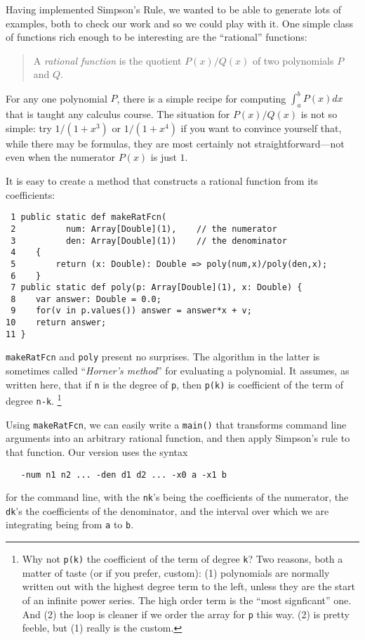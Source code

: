 Having implemented Simpson's Rule, we wanted to be able to generate lots of
examples, both to check our work and so we could play with it.  One simple
class of functions rich enough to be interesting are the ``rational'' functions:
\begin{quote}
A {\em rational function} is the quotient $P(x)/Q(x)$ of two polynomials $P$
and $Q$.
\end{quote} 
  For any one polynomial $P$, there is a simple recipe for computing
$\int_a^b P(x)dx$ that is taught any calculus course.  The situation
for $P(x)/Q(x)$ is not so simple: try $1/(1+x^3)$ or $1/(1+x^4)$ if you want to
convince yourself that, while there may be formulas, they are most certainly not
straightforward---not even when the numerator $P(x)$ is just $1$.

It is easy to create a method that constructs a rational function from its 
coefficients:
\begin{verbatim}
 1 public static def makeRatFcn(
 2          num: Array[Double](1),    // the numerator
 3          den: Array[Double](1))    // the denominator 
 4    {   
 5        return (x: Double): Double => poly(num,x)/poly(den,x);
 6    }
 7 public static def poly(p: Array[Double](1), x: Double) {
 8    var answer: Double = 0.0;
 9    for(v in p.values()) answer = answer*x + v;
10    return answer;
11 }
\end{verbatim}

{\tt makeRatFcn} and {\tt poly} present no surprises.  The algorithm in the
latter is sometimes called ``{\em Horner's method}'' for evaluating a polynomial.
It assumes, as written here, that if {\tt n} is the degree of {\tt p}, then
{\tt p(k)} is coefficient of the term of degree {\tt n-k}.
\footnote{
Why not {\tt p(k)} the coefficient of the term of degree {\tt k}?  Two reasons,
both a matter of taste (or if you prefer, custom):  (1) polynomials are normally
written out with the highest degree term to the left, unless they are the
start of an infinite power series.  The high order term is the ``most signficant''
one.  And (2) the loop is cleaner if we order the array for {\tt p} this way.
(2) is pretty feeble, but (1) really is the custom.
}

Using {\tt makeRatFcn}, we can easily write a {\tt main()} that transforms command
line arguments into an arbitrary rational function, and then apply Simpson's
rule to that function. Our version uses the syntax
\begin{verbatim}
   -num n1 n2 ... -den d1 d2 ... -x0 a -x1 b
\end{verbatim}
for the command line, with the {\tt nk}'s being the coefficients of the
numerator, the {\tt dk}'s the coefficients of the denominator, and the interval
over which we are integrating being from {\tt a} to {\tt b}.


